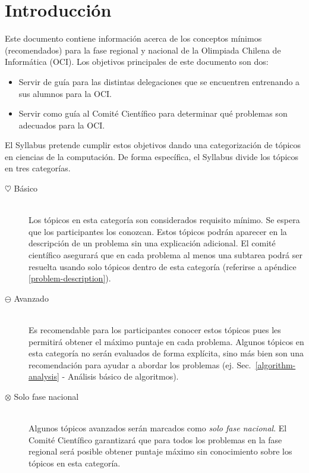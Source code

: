 \documentclass{article}
\newcommand{\basic}{$\heartsuit$}
\newcommand{\advanced}{$\ominus$}
\newcommand{\ultra}{$\otimes$}
\begin{document}
\section{Introducción}\label{sec:intro}
Este documento contiene información acerca de los conceptos mínimos (recomendados)
para la fase regional y nacional de la Olimpiada Chilena de Informática (OCI).
Los objetivos principales de este documento son dos:
\begin{itemize}
  \item Servir de guía para las distintas delegaciones que se encuentren
    entrenando a sus alumnos para la OCI.
  \item Servir como guía al Comité Científico para determinar qué problemas son
    adecuados para la OCI.
\end{itemize}
El Syllabus pretende cumplir estos objetivos dando una categorización de tópicos
en ciencias de la computación.
De forma específica, el Syllabus divide los tópicos en tres categorías.
\begin{description}
\item[\basic{} Básico]
  \hspace{1em} \\
  Los tópicos en esta categoría son considerados requisito mínimo.
    Se espera que los participantes los conozcan.
    Estos tópicos podrán aparecer en la descripción de un problema sin una
    explicación adicional.
    El comité científico asegurará que en cada problema al menos una subtarea podrá
    ser resuelta usando solo tópicos dentro de esta categoría (referirse a
    apéndice \ref{problem-description}).
  \item[\advanced{} Avanzado]
    \hspace{1em} \\
    Es recomendable para los participantes conocer estos tópicos pues les
    permitirá obtener el máximo puntaje en cada problema.
    Algunos tópicos en esta categoría no serán evaluados de forma explícita,
    sino más bien son una recomendación para ayudar a abordar los problemas (ej.
    Sec.~\ref{algorithm-analysis} - Análisis básico de algoritmos).
  \item[\ultra{} Solo fase nacional]
    \hspace{1em} \\
    Algunos tópicos avanzados serán marcados como \textit{solo fase nacional}.
    El Comité Científico garantizará que para todos los problemas en la
    fase regional será posible obtener puntaje máximo sin conocimiento sobre los
    tópicos en esta categoría.
\end{description}
\end{document}
